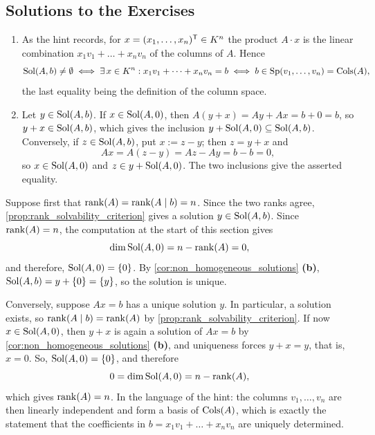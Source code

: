 \subsection{Solutions to the Exercises}
\label{sec:solutions_more_matrices_lineq}

\begin{exercisesolution}
\label{sol:non_homogeneous_solutions}
\begin{enumerate}[label=\textbf{(\alph*)}]
    \item As the hint records, for $x = (x_1, \dots, x_n)^{\mathsf{T}} \in K^n$ the product $A \cdot x$ is the linear combination $x_1 v_1 + \dots + x_n v_n$ of the columns of $A$. Hence
    \[
    \operatorname{Sol}(A, b) \neq \emptyset \iff \exists\, x \in K^n : x_1 v_1 + \dots + x_n v_n = b \iff b \in \operatorname{Sp}(v_1, \dots, v_n) = \operatorname{Cols}(A),
    \]
    the last equality being the definition of the column space.

    \item Let $y \in \operatorname{Sol}(A, b)$. If $x \in \operatorname{Sol}(A, 0)$, then $A(y + x) = Ay + Ax = b + 0 = b$, so $y + x \in \operatorname{Sol}(A, b)$, which gives the inclusion $y + \operatorname{Sol}(A, 0) \subseteq \operatorname{Sol}(A, b)$. Conversely, if $z \in \operatorname{Sol}(A, b)$, put $x := z - y$; then $z = y + x$ and
    \[
    Ax = A(z - y) = Az - Ay = b - b = 0,
    \]
    so $x \in \operatorname{Sol}(A, 0)$ and $z \in y + \operatorname{Sol}(A, 0)$. The two inclusions give the asserted equality. \qedhere
\end{enumerate}
\end{exercisesolution}

\begin{exercisesolution}
\label{sol:unique_solution_rank_criterion}
Suppose first that $\operatorname{rank}(A) = \operatorname{rank}(A \mid b) = n$. Since the two ranks agree, \cref{prop:rank_solvability_criterion} gives a solution $y \in \operatorname{Sol}(A, b)$. Since $\operatorname{rank}(A) = n$, the computation at the start of this section gives
\[
\dim \operatorname{Sol}(A, 0) = n - \operatorname{rank}(A) = 0,
\]
and therefore, $\operatorname{Sol}(A, 0) = \{0\}$. By \cref{cor:non_homogeneous_solutions} \textbf{(b)}, $\operatorname{Sol}(A, b) = y + \{0\} = \{y\}$, so the solution is unique.

Conversely, suppose $Ax = b$ has a unique solution $y$. In particular, a solution exists, so $\operatorname{rank}(A \mid b) = \operatorname{rank}(A)$ by \cref{prop:rank_solvability_criterion}. If now $x \in \operatorname{Sol}(A, 0)$, then $y + x$ is again a solution of $Ax = b$ by \cref{cor:non_homogeneous_solutions} \textbf{(b)}, and uniqueness forces $y + x = y$, that is, $x = 0$. So, $\operatorname{Sol}(A, 0) = \{0\}$, and therefore
\[
0 = \dim \operatorname{Sol}(A, 0) = n - \operatorname{rank}(A),
\]
which gives $\operatorname{rank}(A) = n$. In the language of the hint: the columns $v_1, \dots, v_n$ are then linearly independent and form a basis of $\operatorname{Cols}(A)$, which is exactly the statement that the coefficients in $b = x_1 v_1 + \dots + x_n v_n$ are uniquely determined.
\end{exercisesolution}

